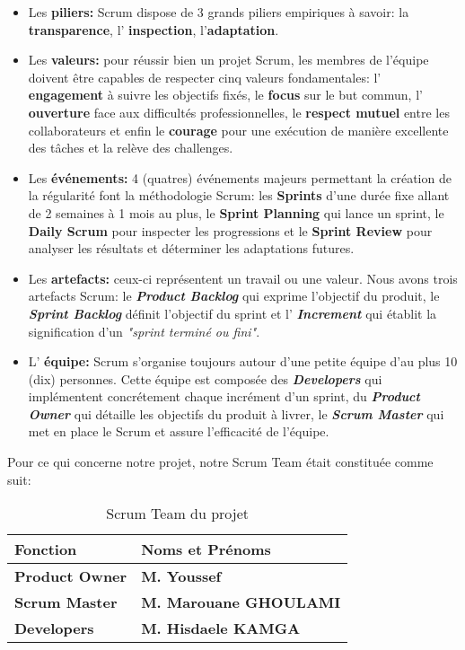         \begin{itemize}
            \item Les \textbf{piliers: } Scrum dispose de 3 grands piliers empiriques à savoir: la \textbf{transparence}, l' \textbf{inspection},  l'\textbf{adaptation}.
            \item Les \textbf{valeurs: }pour réussir bien un projet Scrum, les membres de l'équipe doivent être capables de respecter cinq valeurs fondamentales: l' \textbf{engagement} à suivre les objectifs fixés, le \textbf{focus} sur le but commun, l' \textbf{ouverture} face aux difficultés professionnelles, le \textbf{respect mutuel} entre les collaborateurs et enfin le \textbf{courage} pour une exécution de manière excellente des tâches et la relève des challenges.
            \item Les \textbf{événements: } 4 (quatres) événements majeurs permettant la création de la régularité font la méthodologie Scrum: les \textbf{Sprints} d'une durée fixe allant de 2 semaines à 1 mois au plus, le \textbf{Sprint Planning} qui lance un sprint, le \textbf{Daily Scrum} pour inspecter les progressions et le \textbf{Sprint Review} pour analyser les résultats et déterminer les adaptations futures.
            \item Les \textbf{artefacts: }ceux-ci représentent un travail ou une valeur. Nous avons trois artefacts Scrum: le \textbf{\textit{Product Backlog}} qui exprime l'objectif du produit, le \textbf{\textit{Sprint Backlog}} définit l'objectif du sprint et l' \textbf{\textit{Increment}} qui établit la signification d'un \textit{"sprint terminé ou fini"}.
            
            \item L' \textbf{équipe: }Scrum s'organise toujours autour d'une petite équipe d'au plus 10 (dix) personnes. Cette équipe est composée des \textbf{\textit{Developers}} qui implémentent concrétement chaque incrément d'un sprint, du \textbf{\textit{Product Owner}} qui détaille les objectifs du produit à livrer, le \textbf{\textit{Scrum Master}} qui met en place le Scrum et assure l'efficacité de l'équipe.
        \end{itemize}
    Pour ce qui concerne notre projet, notre Scrum Team était constituée comme suit:
        \begin{table}[H]
            \centering
            \begin{tabular}{|l|l|}
                \hline
                \rowcolor{Gray}
                \textbf{Fonction} & \textbf{Noms et Prénoms} \\ \hline
                \textbf{Product Owner} & \textbf{M. Youssef} \\ \hline
                \textbf{Scrum Master} & \textbf{M. Marouane GHOULAMI} \\ \hline
                \textbf{Developers} & \textbf{M. Hisdaele KAMGA} \\ \hline  
            \end{tabular}
            \caption{Scrum Team du projet}
        \end{table}
